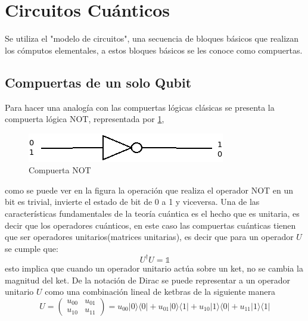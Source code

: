 \documentclass[a4paper]{article}
\begin{document}
\section{Circuitos Cuánticos}
Se utiliza el "modelo de circuitos", una secuencia de bloques básicos que realizan los cómputos elementales, a estos bloques básicos se les conoce como compuertas.
\subsection{Compuertas de un solo Qubit}
Para hacer una analogía con las compuertas lógicas clásicas se presenta la compuerta lógica NOT, representada por \ref{fig::NOT_gate}, 
\begin{figure}[h]
\begin{center}
\includegraphics[scale=0.4]{./classicalNOT.png} 
\end{center} 
\caption{Compuerta NOT}
\label{fig::NOT_gate}
\end{figure}
como se puede ver en la figura la operación que realiza el operador NOT en un bit es trivial, invierte el estado de bit de 0 a 1 y viceversa.
Una de las características fundamentales de la teoría cuántica es el hecho que es unitaria, es decir que los operadores cuánticos, en este caso las compuertas cuánticas tienen que ser operadores unitarios(matrices unitarias), es decir que para un operador $U$ se cumple que:
\begin{equation}
U^\dagger U=\mathbb{1}
\end{equation}
esto implica que cuando un operador unitario actúa sobre un ket, no se cambia la magnitud del ket. De la notación de Dirac se puede representar a un operador unitario $U$ como  una combinación lineal de ketbras de la siguiente manera
\begin{equation}
U=
	\begin{pmatrix}
		u_{00} &u_{01} \\
		u_{10} &u_{11}
	\end{pmatrix}=u_{00}|0\rangle\langle 0|+u_{01}|0\rangle\langle 1|+u_{10}|1\rangle\langle 0|+
	u_{11}|1\rangle\langle 1|
\end{equation}
\end{document}
